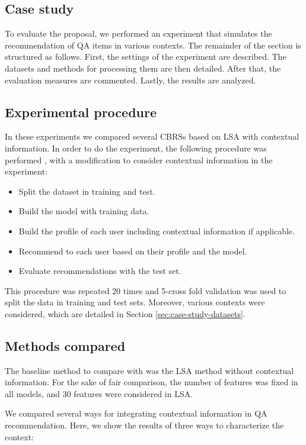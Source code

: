 \documentclass[preprint]{elsarticle}
\begin{document}
\begin{spacing}{1.5}
\section{Case study}
\label{sec:case-study}

To evaluate the proposal, we performed an experiment that simulates the recommendation of QA items in various contexts. The remainder of the section is structured as follows. First, the settings of the experiment are described. The datasets and methods for processing them are then detailed. After that, the evaluation measures are commented. Lastly, the results are analyzed.

\subsection{Experimental procedure}

In these experiments we compared several CBRSs based on LSA with contextual information. In order to do the experiment, the following procedure was performed \cite{Sarwar2001}, with a modification to consider contextual information in the experiment:
\begin{itemize}
	\item Split the dataset in training and test.
	\item Build the model with training data.
	\item Build the profile of each user including contextual information if applicable.
	\item Recommend to each user based on their profile and the model.
	\item Evaluate recommendations with the test set.
\end{itemize}

This procedure was repeated 20 times and 5-cross fold validation was used to split the data in training and test sets. Moreover, various contexts were considered, which are detailed in Section \ref{sec:case-study-datasets}.

\subsection{Methods compared}

The baseline method to compare with was the LSA method without contextual information. For the sake of fair comparison, the number of features was fixed in all models, and 30 features were considered in LSA.

We compared several ways for integrating contextual information in QA recommendation. Here, we show the results of three ways to characterize the context:


\end{spacing}
\end{document}
